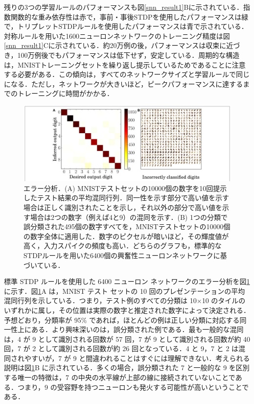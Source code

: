 \documentclass[a4paper, titlepage]{jsarticle}
\begin{document}
\par
残りの3つの学習ルールのパフォーマンスも図\ref{snn_result1}Bに示されている．指数関数的な重み依存性は赤で，事前・事後STDPを使用したパフォーマンスは緑で，トリプレットSTDPルールを使用したパフォーマンスは青で示されている．対称ルールを用いた1600ニューロンネットワークのトレーニング精度は図\ref{snn_result1}Cに示されている．約20万例の後，パフォーマンスは収束に近づき，100万例後でもパフォーマンスは低下せず，安定している．周期的な構造は，MNISTトレーニングセットを繰り返し提示しているためであることに注意する必要がある．この傾向は，すべてのネットワークサイズと学習ルールで同じになる．ただし，ネットワークが大きいほど，ピークパフォーマンスに達するまでのトレーニングに時間がかかる．
\begin{figure}[htbp]
   \centering
   \includegraphics[scale=0.3]{snn_result2.jpeg}
   \caption{エラー分析．(A) MNISTテストセットの10000個の数字を10回提示したテスト結果の平均混同行列．同一性を示す部分で高い値を示す場合は正しく識別されたことを示し，それ以外の部分で高い値を示す場合は2つの数字（例えば4と9）の混同を示す．(B) 1つの分類で誤分類された495個の数字すべてを，MNISTテストセットの10000個の数字全体に適用した．数字のピクセルが暗いほど，その輝度値が高く，入力スパイクの頻度も高い．どちらのグラフも，標準的なSTDPルールを用いた6400個の興奮性ニューロンネットワークに基づいている．}
   \label{snn_result2}
\end{figure}
\par
標準 STDP ルールを使用した 6400 ニューロン ネットワークのエラー分析を図\ref{snn_result2}に示す．図\ref{snn_result2}A は，MNIST テスト セットの 10 回のプレゼンテーションの平均混同行列を示している．つまり，テスト例のすべての分類は 10$\times$10 のタイルのいずれかに属し，その位置は実際の数字と推定された数字によって決定される．予想どおり，分類率が 95\% であれば，ほとんどの例は正しい分類に対応する同一性上にある．より興味深いのは，誤分類された例である．最も一般的な混同は，4 が 9 として識別される回数が 57 回，7 が 9 として識別される回数が約 40 回，7 が 2 として識別される回数が約 26 回となっている．4 と 9，7 と 2 は混同されやすいが，7 が 9 と間違われることはすぐには理解できない．考えられる説明は図\ref{snn_result2}B に示されている．多くの場合，誤分類された 7 と一般的な 9 を区別する唯一の特徴は，7 の中央の水平線が上部の線に接続されていないことである．つまり，9 の受容野を持つニューロンも発火する可能性が高いということである．
\end{document}
